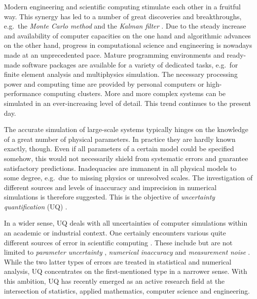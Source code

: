Modern engineering and scientific computing stimulate each other in a fruitful way.
This synergy has led to a number of great discoveries and breakthroughs,
e.g.\ the \emph{Monte Carlo method} \cite{MCMC:Metropolis1949} and the \emph{Kalman filter} \cite{Bayesian:Kalman1960,Bayesian:Kalman1961}.
Due to the steady increase and availability of computer capacities on the one hand and algorithmic advances on the other hand,
progress in computational science and engineering is nowadays made at an unprecedented pace.
Mature programming environments and ready-made software packages are available for a variety of dedicated tasks, e.g.\ for finite element analysis and multiphysics simulation.
The necessary processing power and computing time are provided by personal computers or high-performance computing clusters.
More and more complex systems can be simulated in an ever-increasing level of detail.
This trend continues to the present day.
\par %
The accurate simulation of large-scale systems typically hinges on the knowledge of a great number of physical parameters.
In practice they are hardly known exactly, though.
Even if all parameters of a certain model could be specified somehow, this would not necessarily shield from systematic errors and guarantee satisfactory predictions.
Inadequacies are immanent in all physical models to some degree, e.g.\ due to missing physics or unresolved scales.
The investigation of different sources and levels of inaccuracy and imprecision in numerical simulations is therefore suggested.
This is the objective of \emph{uncertainty quantification} (UQ) \cite{Uncertainty:Smith2014,Uncertainty:Sullivan2015}.
\par %
In a wider sense, UQ deals with all uncertainties of computer simulations within an academic or industrial context.
One certainly encounters various quite different sources of error in scientific computing \cite{Uncertainty:Oberkampf2010,Uncertainty:MurraySmith2015}.
These include but are not limited to \emph{parameter uncertainty} \cite{Uncertainty:Rocquigny2008,Uncertainty:Rocquigny2012},
\emph{numerical inaccuracy} \cite{Computing:Higham2002,Computing:Deuflhard2003,Computing:Quarteroni2007}
and \emph{measurement noise} \cite{Uncertainty:Fornasini2008,Uncertainty:Gupta2012,Uncertainty:Grabe2014}.
While the two latter types of errors are treated in statistical and numerical analysis, UQ concentrates on the first-mentioned type in a narrower sense.
With this ambition, UQ has recently emerged as an active research field at the intersection of statistics, applied mathematics, computer science and engineering.
